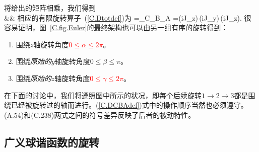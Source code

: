 将给出的矩阵相乘，我们得到
\eqa {} \nonumber \\
&&\mbox{}
\ena
相应的有限旋转算子~(\ref{C.Dtotdef})为
\eq \label{C.DCBAdef}
\sD=\sD_C\sD_B\sD_A
=\exp(i\gamma J_z)\,\exp(i\beta J_y)\,\exp(i\alpha J_z).
\en
很容易证明，图~\ref{C.fig.Euler}的最终架构也可以由另一组有序的旋转得到：
\begin{enumerate}
\item 围绕$z$轴旋转角度\textcolor{red}{$0\leq\alpha\leq 2\pi$}。
\item 围绕{\em 原始的\/}$y$轴旋转角度$0\leq\beta\leq\pi$。
\item 围绕{\em 原始的\/}$z$轴旋转角度\textcolor{red}{$0\leq\gamma\leq 2\pi$}。
\end{enumerate}
在下面的讨论中，我们将遵照图中所示的状况，即每个后续旋转$1\rightarrow 2\rightarrow 3$都是围绕已经被旋转过的轴而进行。(\ref{C.DCBAdef})式中的操作顺序当然也必须遵守。
(A.54)和(C.238)两式之间的符号差异反映了后者的被动特性。
%

\subsection{广义球谐函数的旋转}
%
%

